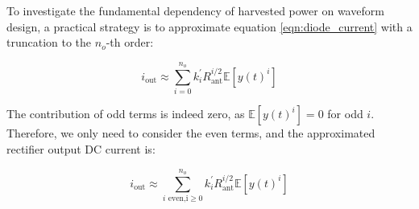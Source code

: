 To investigate the fundamental dependency of harvested power on waveform design, a practical strategy is to approximate equation \ref{eqn:diode_current} with a truncation to the ${n_o}$-th order:

\begin{equation}\label{eqn:output_current_truncation}
  {i_{{\text{out}}}} \approx \sum\limits_{i = 0}^{{n_o}} {k_i^\prime } R_{{\text{ant}}}^{i/2}\mathbb{E}\left[ {y{{(t)}^i}} \right]
\end{equation}

The contribution of odd terms is indeed zero, as $\mathbb{E}\left[ {y{{(t)}^i}} \right] = 0$ for odd $i$. Therefore, we only need to consider the even terms, and the approximated rectifier output DC current is:

\begin{equation}\label{eqn:output_current}
  {i_{{\text{out}}}} \approx \sum\limits_{i{\text{ even,i}} \geqslant 0}^{{n_o}} {k_i^\prime } R_{{\text{ant}}}^{i/2}\mathbb{E}\left[ {y{{(t)}^i}} \right]
\end{equation}
